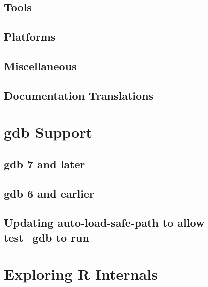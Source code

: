 \documentclass[]{book}
\begin{document}
\hypertarget{tools}{%
\section{Tools}\label{tools}}

\hypertarget{platforms}{%
\section{Platforms}\label{platforms}}

\hypertarget{miscellaneous}{%
\section{Miscellaneous}\label{miscellaneous}}

\hypertarget{documentation-translations}{%
\section{Documentation Translations}\label{documentation-translations}}

\hypertarget{gdb-support}{%
\chapter{gdb Support}\label{gdb-support}}

\hypertarget{gdb-7-and-later}{%
\section{gdb 7 and later}\label{gdb-7-and-later}}

\hypertarget{gdb-6-and-earlier}{%
\section{gdb 6 and earlier}\label{gdb-6-and-earlier}}

\hypertarget{updating-auto-load-safe-path-to-allow-test_gdb-to-run}{%
\section{Updating auto-load-safe-path to allow test\_gdb to run}\label{updating-auto-load-safe-path-to-allow-test_gdb-to-run}}

\hypertarget{exploring-r-internals}{%
\chapter{Exploring R Internals}\label{exploring-r-internals}}
\end{document}
